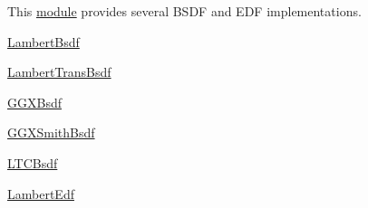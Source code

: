 This \hyperlink{group___b_s_d_f_module}{module} provides several B\+S\+DF and E\+DF implementations.


\begin{DoxyItemize}
\item \hyperlink{structcugar_1_1_lambert_bsdf}{Lambert\+Bsdf}
\item \hyperlink{structcugar_1_1_lambert_trans_bsdf}{Lambert\+Trans\+Bsdf}
\item \hyperlink{structcugar_1_1_g_g_x_bsdf}{G\+G\+X\+Bsdf}
\item \hyperlink{structcugar_1_1_g_g_x_smith_bsdf}{G\+G\+X\+Smith\+Bsdf}
\item \hyperlink{structcugar_1_1_l_t_c_bsdf}{L\+T\+C\+Bsdf}
\item \hyperlink{structcugar_1_1_lambert_edf}{Lambert\+Edf} 
\end{DoxyItemize}